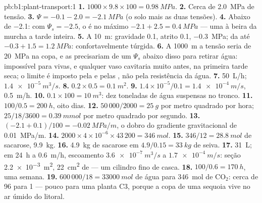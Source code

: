 \begin{solution}{pb:b1:plant-transport:1}
\textbf{1.} $1000\times 9.8\times 100 = \qty{0.98}{MPa}$.
\textbf{2.} Cerca de \qty{2.0}{MPa} de tensão.
\textbf{3.} $\Psi = -0.1 - 2.0 = \qty{-2.1}{MPa}$ (o solo mais as duas
tensões).
\textbf{4.} Abaixo de \qty{-2.1}{}: com $\Psi_s = -2.5$, o 
é no máximo $-2.1 + 2.5 = \qty{0.4}{MPa}$ --- uma  à beira da
murcha a tarde inteira.
\textbf{5.} A \qty{10}{m}: gravidade \qty{0.1}{}, atrito \qty{0.1}{},
 \qty{-0.3}{MPa};  da  até
$-0.3 + 1.5 = \qty{1.2}{MPa}$: confortavelmente túrgida.
\textbf{6.} A \qty{1000}{m} a tensão seria de \qty{20}{MPa} na copa, e
as  precisariam de um $\Psi_s$ abaixo disso para retirar água:
impossível para  vivas, e qualquer vaso cavitaria muito antes,
na primeira tarde seca; o limite é imposto pela  e pelas
, não pela resistência da água.
\textbf{7.} \qty{50}{L/h}; $\qty{1.4e-5}{m^3/s}$.
\textbf{8.} $0.2\times 0.5 = \qty{0.1}{m^2}$.
\textbf{9.} $1.4\times 10^{-5}/0.1 = \qty{1.4e-4}{m/s}$, \qty{0.5}{m/h}.
\textbf{10.} $0.1\times 100 = \qty{10}{m^3}$: dez toneladas de água suspensas no tronco.
\textbf{11.} $100/0.5 = \qty{200}{h}$, oito dias.
\textbf{12.} $50\,000/2000 = \qty{25}{g}$ por metro quadrado por hora;
$25/18/3600 = \qty{0.39}{mmol}$ por metro quadrado por segundo.
\textbf{13.} $(-2.1 + 0.1)/100 = \qty{-0.02}{MPa/m}$, o dobro do
gradiente gravitacional de \qty{0.01}{MPa/m}.
\textbf{14.} $2000\times 4\times 10^{-6}\times 43\,200 = \qty{346}{mol}$.
\textbf{15.} $346/12 = \qty{28.8}{mol}$ de sacarose, \qty{9.9}{kg}.
\textbf{16.} \qty{4.9}{kg} de sacarose em $4.9/0.15 = \qty{33}{kg}$ de
seiva.
\textbf{17.} \qty{31}{L}; em \qty{24}{h} a \qty{0.6}{m/h}, escoamento
$\qty{3.6e-7}{m^3/s}$ a $\qty{1.7e-4}{m/s}$: seção
\qty{2.2e-3}{m^2}, \qty{22}{cm^2} de  --- um cilindro
fino de casca.
\textbf{18.} $100/0.6 = \qty{170}{h}$, uma semana.
\textbf{19.} $600\,000/18 = \qty{33000}{mol}$ de água para
\qty{346}{mol} de $\mathrm{CO_2}$: cerca de 96 para 1 --- pouco para uma
planta C3, porque a copa de uma sequoia vive no ar úmido do litoral.

\end{solution}

